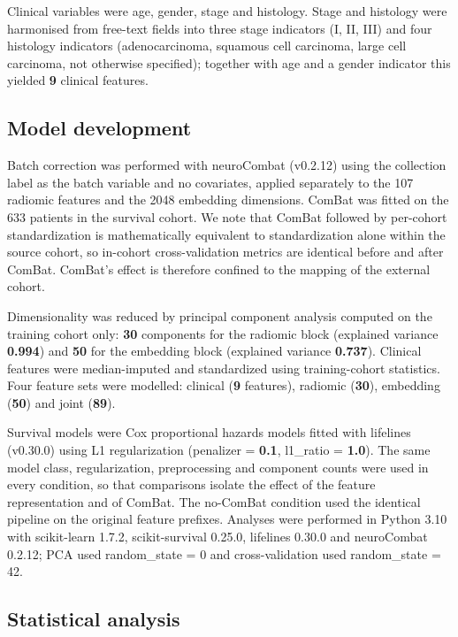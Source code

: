 \documentclass[a4paper,fleqn]{cas-sc}
\begin{document}
Clinical variables were age, gender, stage and histology. Stage and histology were harmonised from free-text fields into three stage indicators (I, II, III) and four histology indicators (adenocarcinoma, squamous cell carcinoma, large cell carcinoma, not otherwise specified); together with age and a gender indicator this yielded \textbf{9} clinical features.

\subsection{Model development}

Batch correction was performed with neuroCombat (v0.2.12) using the collection label as the batch variable and no covariates, applied separately to the 107 radiomic features and the 2048 embedding dimensions. ComBat was fitted on the 633 patients in the survival cohort. We note that ComBat followed by per-cohort standardization is mathematically equivalent to standardization alone within the source cohort, so in-cohort cross-validation metrics are identical before and after ComBat. ComBat's effect is therefore confined to the mapping of the external cohort.

Dimensionality was reduced by principal component analysis computed on the training cohort only: \textbf{30} components for the radiomic block (explained variance \textbf{0.994}) and \textbf{50} for the embedding block (explained variance \textbf{0.737}). Clinical features were median-imputed and standardized using training-cohort statistics. Four feature sets were modelled: clinical (\textbf{9} features), radiomic (\textbf{30}), embedding (\textbf{50}) and joint (\textbf{89}).

Survival models were Cox proportional hazards models fitted with lifelines (v0.30.0) using L1 regularization (penalizer = \textbf{0.1}, l1\_ratio = \textbf{1.0}). The same model class, regularization, preprocessing and component counts were used in every condition, so that comparisons isolate the effect of the feature representation and of ComBat. The no-ComBat condition used the identical pipeline on the original feature prefixes. Analyses were performed in Python 3.10 with scikit-learn 1.7.2, scikit-survival 0.25.0, lifelines 0.30.0 and neuroCombat 0.2.12; PCA used random\_state = 0 and cross-validation used random\_state = 42.

\subsection{Statistical analysis}
\end{document}
